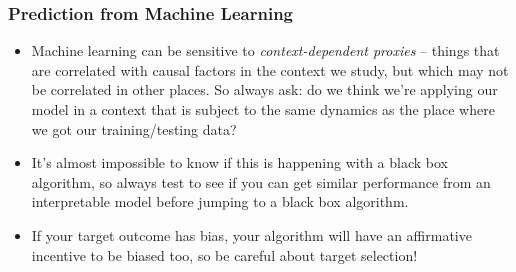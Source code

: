 \documentclass[12pt]{article}
\begin{document}
\subsubsection*{Prediction from Machine Learning}
\begin{itemize}
    \item Machine learning can be sensitive to \emph{context-dependent proxies} -- things that are correlated with causal factors in the context we study, but which may not be correlated in other places. So always ask: do we think we're applying our model in a context that is subject to the same dynamics as the place where we got our training/testing data?
    \item It's almost impossible to know if this is happening with a black box algorithm, so always test to see if you can get similar performance from an interpretable model before jumping to a black box algorithm.
    \item If your target outcome has bias, your algorithm will have an affirmative incentive to be biased too, so be careful about target selection!
\end{itemize}
\end{document}
